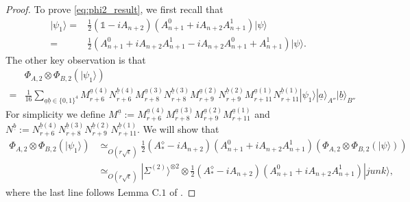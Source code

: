 \documentclass[11pt,letterpaper]{article}
\newcommand{\ket}[1]{|#1\rangle}
\newcommand{\x}{\otimes}
\newcommand{\1}{\mathbb{1}}
\newcommand{\EPR}[1]{\Sigma^{(#1)}}
\newcommand{\ua}{\underline{a}}
\newcommand{\ub}{\underline{b}}
\newcommand{\se}{\sqrt{\epsilon}}
\newcommand{\appd}[1]{\simeq_{#1}}
\theoremstyle{definition}
\begin{document}
\begin{proof}
To prove \cref{eq:phi2_result}, we first
recall that 
\begin{align}
	\ket{\psi_1} =&\frac{1}{2} (\1 - iA_{n+2})(A_{n+1}^0 + iA_{n+2}A_{n+1}^1) \ket{\psi} \\
	=&\frac{1}{2} (A_{n+1}^0 + iA_{n+2}A_{n+1}^1 - iA_{n+2}A_{n+1}^0 + A_{n+1}^1) \ket{\psi}.
\end{align}
The other key observation is that 
\begin{align}
	&\Phi_{A,2} \x \Phi_{B,2} (\ket{\psi_1})  \\
	= &\frac{1}{16} \sum_{\ua \ub \in\{0,1\}^4}
	M_{r+6}^{\ua(4)}N_{r+6}^{\ub(4)}M_{r+8}^{\ua(3)}N_{r+8}^{\ub(3)}M_{r+9}^{\ua(2)}N_{r+9}^{\ub(2)}M_{r+11}^{\ua(1)}N_{r+11}^{\ub(1)}
	\ket{\psi_1} \ket{\ua}_{A''} \ket{\ub}_{B''}
\end{align}
For simplicity we define $M^{\ua} := M_{r+6}^{\ua(4)}M_{r+8}^{\ua(3)}M_{r+9}^{\ua(2)}M_{r+11}^{\ua(1)}$ and
$N^{\ub} := N_{r+6}^{\ub(4)}N_{r+8}^{\ub(3)}N_{r+9}^{\ub(2)}N_{r+11}^{\ub(1)} $.
We will show that 
\begin{align}
	\Phi_{A,2} \x \Phi_{B,2} (\ket{\psi_1}) &\appd{O(r\se)} 
	\frac{1}{2} (A_\ast^\diamond - iA_{n+2})(A_{n+1}^0 + iA_{n+2}A_{n+1}^1)(\Phi_{A,2} \x \Phi_{B,2}(\ket{\psi})) \\
	& \appd{O(r\se)} \ket{\EPR{2}}^{\x 2} \x \frac{1}{2} (A_\ast^\diamond - iA_{n+2})(A_{n+1}^0 + iA_{n+2}A_{n+1}^1) \ket{junk},
\end{align}
where the last line follows Lemma C.$1$ of \cite{wu2016}.


\end{proof}
\end{document}
